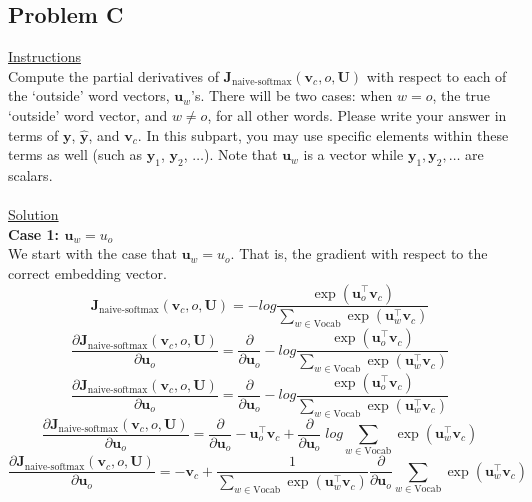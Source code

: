 \documentclass[12pt]{article}
\begin{document}
\subsection{Problem C}
\underline{Instructions}
~\\
Compute the partial derivatives of $\bm J_{\text{naive-softmax}}(\bm v_c, o, \bm U)$ with respect to 
each of the `outside' word vectors, $\bm u_w$'s. There will be two cases: when $w=o$, the true 
`outside' word vector, and $w \neq o$, for all other words. Please write your answer in terms of 
$\bm y$, $\hat{\bm y}$, and $\bm v_c$. In this subpart, you may use specific elements within these 
terms as well (such as $\bm y_1$, $\bm y_2$, $\dots$). Note that $\bm u_w$ is a vector while 
$\bm y_1, \bm y_2, \dots$ are scalars.
~\\
~\\
\underline{Solution}
~\\
\textbf{Case 1: $\bm u_w = u_o$}
~\\
We start with the case that $\bm u_w = u_o$. That is, the gradient with respect to the correct 
embedding vector. 
\begin{equation*}
    \bm J_{\text{naive-softmax}}(\bm v_c, o, \bm U) = 
    -log \frac{\exp(\bm u_{o}^\top \bm v_c)}{\sum_{w \in \text{Vocab}} \exp(\bm u_{w}^\top \bm v_c)}
\end{equation*}
\begin{equation*}
    \frac{\partial \bm J_{\text{naive-softmax}}(\bm v_c, o, \bm U)}{\partial \bm u_o} = 
    \frac{\partial}{\partial \bm u_o} 
    - log \frac{\exp(\bm u_{o}^\top \bm v_c)}{\sum_{w \in \text{Vocab}} \exp(\bm u_{w}^\top \bm v_c)}
\end{equation*}
\begin{equation*}
    \frac{\partial \bm J_{\text{naive-softmax}}(\bm v_c, o, \bm U)}{\partial \bm u_o} = 
    \frac{\partial}{\partial \bm u_o} 
    - log \frac{\exp(\bm u_{o}^\top \bm v_c)}{\sum_{w \in \text{Vocab}} \exp(\bm u_{w}^\top \bm v_c)}
\end{equation*}
\begin{equation*}
    \frac{\partial \bm J_{\text{naive-softmax}}(\bm v_c, o, \bm U)}{\partial \bm u_o} = 
    \frac{\partial}{\partial \bm u_o} 
    - \bm u_o^\top \bm v_c +
    \frac{\partial}{\partial \bm u_o} 
    \; log \sum_{w \in \text{Vocab}} \exp(\bm u_{w}^\top \bm v_c)
\end{equation*}
\begin{equation*}
    \frac{\partial \bm J_{\text{naive-softmax}}(\bm v_c, o, \bm U)}{\partial \bm u_o} = 
    - \bm v_c +
    \frac{1}{\sum_{w \in \text{Vocab}} \exp(\bm u_{w}^\top \bm v_c)}
    \frac{\partial}{\partial \bm u_o} 
    \sum_{w \in \text{Vocab}} \exp(\bm u_{w}^\top \bm v_c)
\end{equation*}
\end{document}
